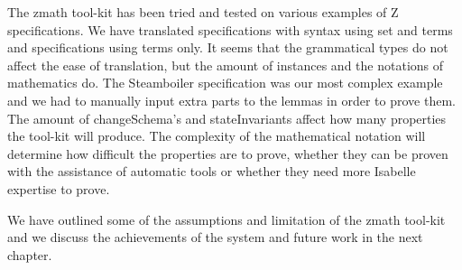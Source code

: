 The \gls{zmath} tool-kit has been tried and tested on various examples of Z
specifications. We have translated specifications with syntax using set and
terms and specifications using terms only. It seems that the grammatical types
do not affect the ease of translation, but the amount of instances and the
notations of mathematics do. The Steamboiler specification was our most complex
example and we had to manually input extra parts to the lemmas in order to prove
them. The amount of changeSchema's and stateInvariants affect how many
properties the tool-kit will produce. The complexity of the mathematical notation
will determine how difficult the properties are to prove, whether they can be
proven with the assistance of automatic tools or whether they need more Isabelle
expertise to prove. 

We have outlined some of the assumptions and limitation of the \gls{zmath}
tool-kit and we discuss the achievements of the system and future work in the next
chapter.
